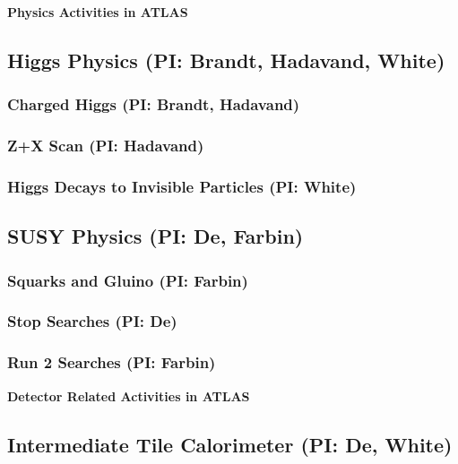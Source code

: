 \documentclass[11pt,english]{article}
\def\twohead#1{\subsection{#1}}
\def\threehead#1{\subsubsection{#1}}
\def\centerhead#1{
	\begin{center}
	\Large\textbf{#1}
	\end{center}}
\begin{document}




\centerhead{Physics Activities in ATLAS}

\twohead{Higgs Physics (PI: Brandt, Hadavand, White)}



\threehead{Charged Higgs (PI: Brandt, Hadavand)}


\threehead{Z+X Scan (PI: Hadavand)}


\threehead{Higgs Decays to Invisible Particles (PI: White)}


\twohead{SUSY Physics (PI: De, Farbin)}



\threehead{Squarks and Gluino (PI: Farbin)}


\threehead{Stop Searches (PI: De)}


\threehead{Run 2 Searches (PI: Farbin)}



\centerhead{Detector Related Activities in ATLAS}

\twohead{Intermediate Tile Calorimeter (PI: De, White)}

\end{document}
